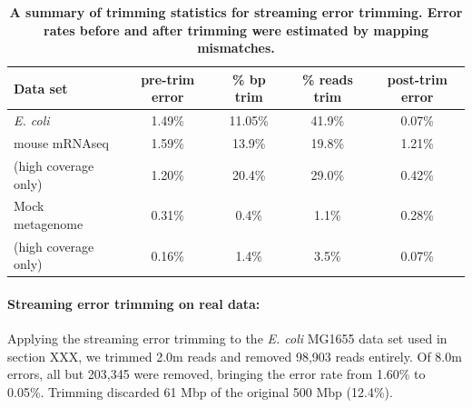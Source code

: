 \documentclass{article}
\begin{document}
\begin{table}
\begin{tabular}{|l|c|c|c|c|}
\hline
Data set        & pre-trim error & \% bp trim & \% reads trim & post-trim error \\
\hline
{\em E. coli}   & 1.49\%         & 11.05\%          & 41.9\%      & 0.07\% \\
mouse mRNAseq   & 1.59\%         & 13.9\%           & 19.8\%      & 1.21\% \\
(high coverage only) & 1.20\%    & 20.4\%           & 29.0\%      & 0.42\% \\
Mock metagenome & 0.31\%         & 0.4\%            & 1.1\%       & 0.28\% \\
(high coverage only) & 0.16\%    & 1.4\%            & 3.5\%       & 0.07\% \\
\hline
\end{tabular}

\caption{{\bf A summary of trimming statistics for streaming error trimming.
Error rates before and after trimming were estimated by mapping mismatches.}}
\label{tab:trimming}
\end{table}

\paragraph{Streaming error trimming on real data:}



%

Applying the streaming error trimming to the {\em E. coli} MG1655 data
set used in section XXX, we trimmed 2.0m reads and removed 98,903
reads entirely.  Of 8.0m errors, all but 203,345 were removed,
bringing the error rate from 1.60\% to 0.05\%.  Trimming discarded 61
Mbp of the original 500 Mbp (12.4\%).

%
\end{document}
